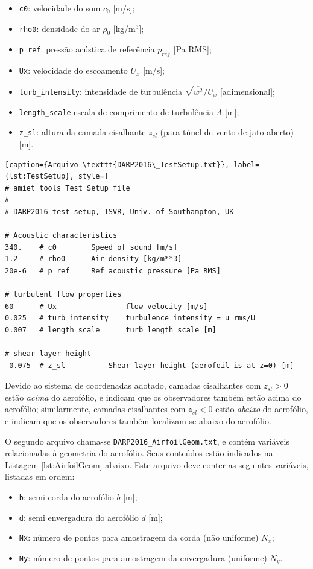 \documentclass[a4paper, 11pt, twoside]{article}
\begin{document}
\begin{itemize}
	\item \verb|c0|: velocidade do som $c_0$ [m/s];
	\item \verb|rho0|: densidade do ar $\rho_0$ [kg/m$^3$];
	\item \verb|p_ref|: pressão acústica de referência $p_{ref}$ [Pa RMS];
	\item \verb|Ux|: velocidade do escoamento $U_x$ [m/s];
	\item \verb|turb_intensity|: intensidade de turbulência $\sqrt{\overline{w^2}}/U_x$ [adimensional];
	\item \verb|length_scale| escala de comprimento de turbulência $\Lambda$ [m];
	\item \verb|z_sl|: altura da camada cisalhante $z_{sl}$ (para túnel de vento de jato aberto) [m].
\end{itemize}

\begin{lstlisting}[caption={Arquivo \texttt{DARP2016\_TestSetup.txt}}, label={lst:TestSetup}, style=]
# amiet_tools Test Setup file
#
# DARP2016 test setup, ISVR, Univ. of Southampton, UK

# Acoustic characteristics
340.	# c0		Speed of sound [m/s]
1.2		# rho0		Air density [kg/m**3]
20e-6	# p_ref		Ref acoustic pressure [Pa RMS]

# turbulent flow properties
60		# Ux				flow velocity [m/s]
0.025	# turb_intensity	turbulence intensity = u_rms/U
0.007	# length_scale		turb length scale [m]

# shear layer height
-0.075	# z_sl			Shear layer height (aerofoil is at z=0) [m]
\end{lstlisting}

Devido ao sistema de coordenadas adotado, camadas cisalhantes com $z_{sl}>0$ estão \emph{acima} do aerofólio, e indicam que os observadores também estão acima do aerofólio; similarmente, camadas cisalhantes com $z_{sl}<0$ estão \emph{abaixo} do aerofólio, e indicam que os observadores também localizam-se abaixo do aerofólio.



O segundo arquivo chama-se \verb|DARP2016_AirfoilGeom.txt|, e contém variáveis relacionadas à geometria do aerofólio. Seus conteúdos estão indicados na Listagem \ref{lst:AirfoilGeom} abaixo. Este arquivo deve conter as seguintes variáveis, listadas em ordem:

\begin{itemize}
	\item \verb|b|: semi corda do aerofólio $b$ [m];
	\item \verb|d|: semi envergadura do aerofólio $d$ [m];
	\item \verb|Nx|: número de pontos para amostragem da corda (não uniforme) $N_x$;
	\item \verb|Ny|: número de pontos para amostragem da envergadura (uniforme) $N_y$.
\end{itemize}
\end{document}
